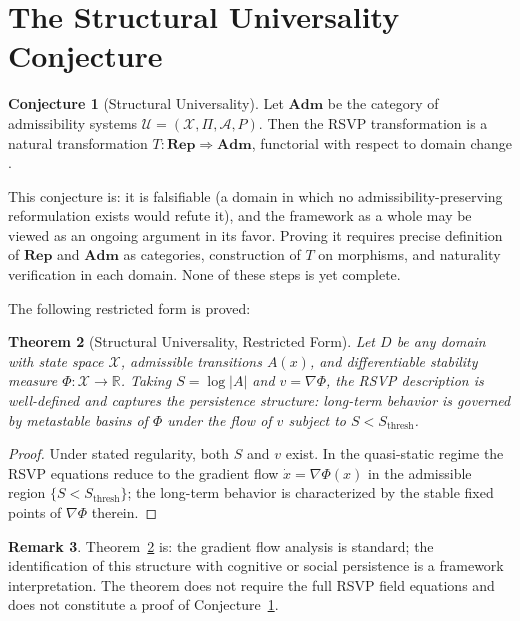 \documentclass[12pt, a4paper]{article}
\theoremstyle{rsvpstyle}
\newtheorem{theorem}{Theorem}[section]
\theoremstyle{definition}
\newtheorem{conjecture}[theorem]{Conjecture}
\newtheorem{remark}[theorem]{Remark}
\newcommand{\Traj}{\mathcal{X}}
\newcommand{\Adm}{\mathcal{A}}
\newcommand{\ProjFam}{\Pi}
\newcommand{\Persist}{P}
\begin{document}
\section{The Structural Universality Conjecture}
\label{sec:universality}

\begin{conjecture}[Structural Universality]
\label{conj:universality}
Let $\mathbf{Adm}$ be the category of admissibility systems
$\mathcal{U} = (\Traj, \ProjFam, \Adm, \Persist)$. Then the RSVP transformation
is a natural transformation $T : \mathbf{Rep} \Rightarrow \mathbf{Adm}$,
functorial with respect to domain change \citep{EilenbergMacLane1945,MacLane1998}.
\end{conjecture}

This conjecture is: it is falsifiable (a domain in which no
admissibility-preserving reformulation exists would refute it), and the
framework as a whole may be viewed as an ongoing argument in its favor.
Proving it requires precise definition of $\mathbf{Rep}$ and $\mathbf{Adm}$
as categories, construction of $T$ on morphisms, and naturality verification
in each domain. None of these steps is yet complete.

The following restricted form is proved:

\begin{theorem}[Structural Universality, Restricted Form]
\label{thm:universal}
Let $D$ be any domain with state space $\Traj$, admissible transitions $A(x)$,
and differentiable stability measure $\Phi : \Traj \to \mathbb{R}$. Taking
$S = \log|A|$ and $v = \nabla\Phi$, the RSVP description is well-defined and
captures the persistence structure: long-term behavior is governed by metastable
basins of $\Phi$ under the flow of $v$ subject to $S < S_\mathrm{thresh}$.
\end{theorem}

\begin{proof}
Under stated regularity, both $S$ and $v$ exist. In the quasi-static regime the
RSVP equations reduce to the gradient flow $\dot{x} = \nabla\Phi(x)$ in the
admissible region $\{S < S_\mathrm{thresh}\}$; the long-term behavior is
characterized by the stable fixed points of $\nabla\Phi$ therein.
\end{proof}

\begin{remark}
Theorem~\ref{thm:universal} is: the gradient flow analysis is standard; the identification of this structure with cognitive or social persistence
is a framework interpretation. The theorem does not require the full RSVP
field equations and does not constitute a proof of Conjecture~\ref{conj:universality}.
\end{remark}
\end{document}
